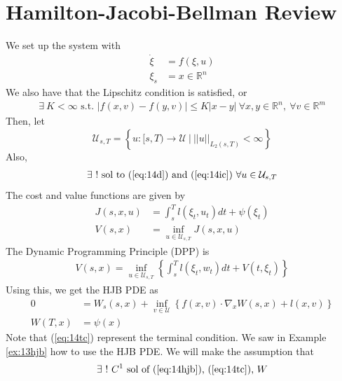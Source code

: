 
\mainmatter
\setcounter{page}{1}

\lectureseries[\course]{\course}

\date{November 17, 2009}

\setaddress

\setcounter{lecture}{13}
\setcounter{chapter}{13}


\section{Hamilton-Jacobi-Bellman Review}

We set up the system with
\begin{align}
\label{eq:14d}
\dot{\xi} &= f(\xi,u) \\
\label{eq:14ic}
\xi_s &= x\in\mathbb{R}^n
\end{align}
We also have that the Lipschitz condition is satisfied, or
\begin{align}
\label{eq:14l}
\exists ~ K<\infty \text{ s.t. } |f(x,v)-f(y,v)| \leq K|x-y| ~\forall x,y\in\mathbb{R}^n, ~\forall v\in\mathbb{R}^m
\end{align}
Then, let
$$\mathcal{U}_{s,T} = \left\lbrace u:[s,T)\to\mathcal{U} ~|~ ||u||_{L_2(s,T)}<\infty \right\rbrace$$
Also,
\begin{align}
\label{eq:14cset}
\exists ~! \text{ sol to (\ref{eq:14d}) and (\ref{eq:14ic}) } \forall u\in\mathcal{U}_{s,T}
\end{align}
The cost and value functions are given by
\begin{align*}
J(s,x,u) &= \int_s^T l(\xi_t,u_t)dt + \psi(\xi_t) \\
V(s,x) &= \inf_{u\in\mathcal{U}_{s,T}} J(s,x,u)
\end{align*}
The Dynamic Programming Principle (DPP) is
\begin{align}
\label{eq:14dpp}
V(s,x) = \inf_{u\in\mathcal{U}_{s,T}} \left\lbrace \int_s^T l(\xi_t,w_t)dt + V(t,\xi_t) \right\rbrace
\end{align}
Using this, we get the HJB PDE as
\begin{align}
\label{eq:14hjb}
0 &= W_s(s,x) + \inf_{v\in\mathcal{U}} \left\lbrace f(x,v)\cdot\nabla_xW(s,x)+l(x,v) \right\rbrace \\
\label{eq:14tc}
W(T,x) &= \psi(x)
\end{align}
Note that (\ref{eq:14tc}) represent the terminal condition. We saw in Example \ref{ex:13hjb} how to use the HJB PDE. We will make the assumption that
\begin{align}
\label{eq:14ae}
\exists~ !~ C^1 \text{ sol of (\ref{eq:14hjb}), (\ref{eq:14tc}), } W
\end{align}

